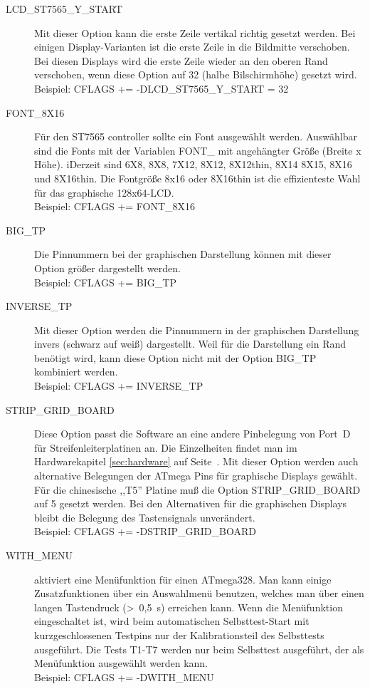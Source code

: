 \begin{description}
  \item[LCD\_ST7565\_Y\_START] Mit dieser Option kann die erste Zeile vertikal richtig gesetzt werden.
Bei einigen Display-Varianten ist die erste Zeile in die Bildmitte verschoben.
Bei diesen Displays wird die erste Zeile wieder an den oberen Rand verschoben, 
wenn diese Option auf 32 (halbe Bilschirmhöhe) gesetzt wird.\\
Beispiel: CFLAGS += -DLCD\_ST7565\_Y\_START = 32

  \item[FONT\_8X16] Für den ST7565 controller sollte ein Font ausgewählt werden.
Auswählbar sind die Fonts mit der Variablen FONT\_ mit angehängter Größe (Breite x Höhe).
iDerzeit sind 6X8, 8X8, 7X12, 8X12, 8X12thin, 8X14 8X15, 8X16 und 8X16thin.
Die Fontgröße 8x16 oder 8X16thin ist die effizienteste Wahl für das graphische 128x64-LCD.\\
Beispiel: CFLAGS += FONT\_8X16

 \item[BIG\_TP] Die Pinnummern bei der graphischen Darstellung können mit dieser Option größer dargestellt werden.\\
Beispiel: CFLAGS += BIG\_TP

 \item[INVERSE\_TP] Mit dieser Option werden die Pinnummern in der graphischen Darstellung invers (schwarz auf weiß) dargestellt.
Weil für die Darstellung ein Rand benötigt wird, kann diese Option nicht mit der Option BIG\_TP kombiniert werden.\\
Beispiel: CFLAGS += INVERSE\_TP

  \item[STRIP\_GRID\_BOARD] Diese Option passt die Software an eine andere Pinbelegung von Port~D für Streifenleiterplatinen an.
Die Einzelheiten findet man im Hardwarekapitel \ref{sec:hardware} auf Seite~\pageref{sec:hardware}.
Mit dieser Option werden auch alternative Belegungen der ATmega Pins für graphische Displays gewählt.
Für die chinesische ,,T5'' Platine muß die Option STRIP\_GRID\_BOARD auf 5 gesetzt werden.
Bei den Alternativen für die graphischen Displays bleibt die Belegung  des Tastensignals unverändert.\\
Beispiel: CFLAGS += -DSTRIP\_GRID\_BOARD

  \item[WITH\_MENU] aktiviert eine Menüfunktion für einen ATmega328. Man kann einige Zusatzfunktionen über ein
Auswahlmenü benutzen, welches man über einen langen Tastendruck (\textgreater~0,5~s) erreichen kann.
Wenn die Menüfunktion eingeschaltet ist, wird beim automatischen Selbsttest-Start mit kurzgeschlossenen Testpins
 nur der Kalibrationsteil des Selbsttests ausgeführt.
Die Tests T1-T7 werden nur beim Selbsttest ausgeführt, der als Menüfunktion ausgewählt werden kann.\\
Beispiel: CFLAGS += -DWITH\_MENU


\end{description}
